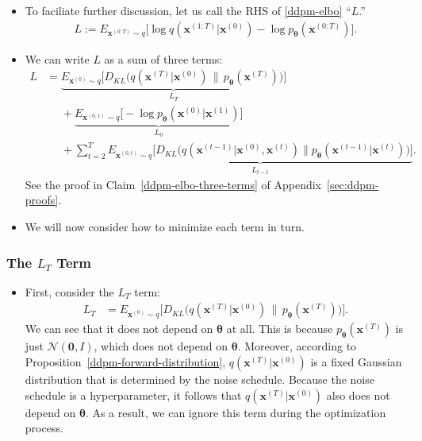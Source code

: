 \documentclass[10pt]{article}
\newcommand{\ve}[1]{\mathbf{#1}}
\newcommand{\ves}[1]{\boldsymbol{#1}}
\begin{document}
\begin{itemize}
\item To faciliate further discussion, let us call the RHS of \eqref{ddpm-elbo} ``$L$.''
\begin{align*}
  L := E_{\ve{x}^{(0:T)} \sim q}\Big[ \log q(\ve{x}^{(1:T)}|\ve{x}^{(0)}) - \log p_{\ves{\theta}}(\ve{x}^{(0:T)}) \Big].
\end{align*}

\item We can write $L$ as a sum of three terms:
\begin{align*}
  L
  &= \underbrace{E_{\ve{x}^{(0)} \sim q} \Big[ D_{KL}\big(q(\ve{x}^{(T)}|\ve{x}^{(0)})\, \big\|\, p_{\ves{\theta}}(\ve{x}^{(T)})\big) \Big]}_{L_T} \\
  &\phantom{=} + \underbrace{E_{\ve{x}^{(0,1)} \sim q} \bigg[ - \log p_{\ves{\theta}}(\ve{x}^{(0)}|\ve{x}^{(1)}) \bigg] }_{L_0} \\
  &\phantom{=} + \sum_{t = 2}^T \underbrace{E_{\ve{x}^{(0,t)}\sim q} \Big[ D_{KL}\big( q(\ve{x}^{(t-1)}|\ve{x}^{(0)},\ve{x}^{(t)})  \big\| p_{\ves{\theta}}(\ve{x}^{(t-1)}|\ve{x}^{(t)}) \big) \Big]}_{L_{t-1}}.
\end{align*}
See the proof in Claim~\ref{ddpm-elbo-three-terms} of Appendix~\ref{sec:ddpm-proofs}.

\item We will now consider how to minimize each term in turn.
\end{itemize}

\subsubsection{The $L_T$ Term}
\begin{itemize}
\item First, consider the $L_T$ term:
\begin{align*}
  L_T 
  &= E_{\ve{x}^{(0)} \sim q} \Big[ D_{KL}\big(q(\ve{x}^{(T)}|\ve{x}^{(0)})\, \big\|\, p_{\ves{\theta}}(\ve{x}^{(T)})\big) \Big].
\end{align*}
We can see that it does not depend on $\ves{\theta}$ at all. This is because $p_{\ves{\theta}}(\ve{x}^{(T)})$ is just $\mathcal{N}(\ve{0},I)$, which does not depend on $\ves{\theta}$. Moreover, according to Proposition~\ref{ddpm-forward-distribution}, $q(\ve{x}^{(T)}|\ve{x}^{(0)})$ is a fixed Gaussian distribution that is determined by the noise schedule. Because the noise schedule is a hyperparameter, it follows that $q(\ve{x}^{(T)}|\ve{x}^{(0)})$ also does not depend on $\ves{\theta}$. As a result, we can ignore this term during the optimization process.
\end{itemize}
\end{document}
